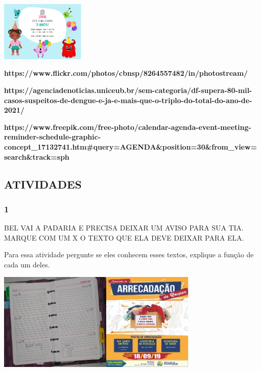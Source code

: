 \includegraphics[width=1.58681in,height=1.13333in]{media/image92.png}

\textbf{https://www.flickr.com/photos/cbnsp/8264557482/in/photostream/}

\textbf{https://agenciadenoticias.uniceub.br/sem-categoria/df-supera-80-mil-casos-suspeitos-de-dengue-e-ja-e-mais-que-o-triplo-do-total-do-ano-de-2021/}

\textbf{https://www.freepik.com/free-photo/calendar-agenda-event-meeting-reminder-schedule-graphic-concept\_17132741.htm\#query=AGENDA\&position=30\&from\_view=search\&track=sph}

\subsection{ATIVIDADES}\label{atividades-3}

\subsubsection{1}\label{section-42}

BEL VAI A PADARIA E PRECISA DEIXAR UM AVISO PARA SUA TIA. MARQUE COM UM
X O TEXTO QUE ELA DEVE DEIXAR PARA ELA.

Para essa atividade pergunte se eles conhecem esses textos, explique a
função de cada um deles.

\includegraphics[width=2.10625in,height=1.86042in]{media/image93.jpeg}\includegraphics[width=1.68611in,height=1.86042in]{media/image94.jpeg}

